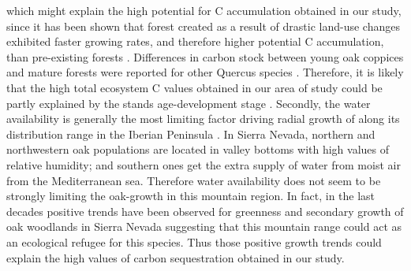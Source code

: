 which might explain the high potential for C accumulation obtained in our study, since it has been shown that forest created as a result of drastic land-use changes exhibited faster growing rates, and therefore higher potential C accumulation, than pre-existing forests \autocite{VilaCabreraetal2017NewForests}. Differences in carbon stock between young oak coppices and mature forests were reported for other Quercus species \autocite{Bruckmanetal2011CarbonPools,Cotillasetal2016AbovegroundBelowground}. Therefore, it is likely that the high total ecosystem C values obtained in our area of study could be partly explained by the stands age-development stage \autocite{Makinecietal2015EcosystemCarbon}. Secondly, the water availability is generally the most limiting factor driving radial growth of \Qpy along its distribution range in the Iberian Peninsula \autocite{GeaIzquierdoCanellas2014LocalClimate}. In Sierra Nevada, northern and northwestern oak populations are located in valley bottoms with high values of relative humidity; and southern ones get the extra supply of water from moist air from the Mediterranean sea. Therefore water availability does not seem to be strongly limiting the oak-growth in this mountain region. In fact, in the last decades positive trends have been observed for greenness and secondary growth of oak woodlands in Sierra Nevada \autocite{GeaIzquierdoCanellas2014LocalClimate,PerezLuqueetal2020LanduseLegacies,RubioCuadradoetal2018AbioticFactors} suggesting that this mountain range could act as an ecological refugee for this species. Thus those positive growth trends could explain the high values of carbon sequestration obtained in our study.

